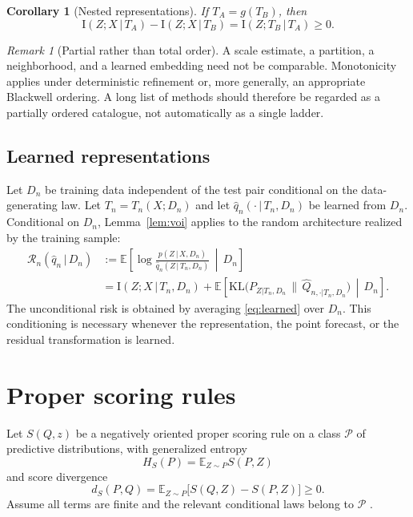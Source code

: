 \documentclass[11pt]{article}
\newtheorem{corollary}[theorem]{Corollary}
\theoremstyle{remark}
\newtheorem{remark}[theorem]{Remark}
\newcommand{\E}{\mathbb{E}}
\newcommand{\KL}{\mathrm{KL}}
\newcommand{\I}{\mathrm{I}}
\newcommand{\given}{\,|\,}
\newcommand{\Dn}{D_n}
\newcommand{\Reg}{\mathcal{R}}
\begin{document}
\begin{corollary}[Nested representations]\label{cor:nested}
If $T_A=g(T_B)$, then
\[
\I(Z;X\given T_A)-\I(Z;X\given T_B)=\I(Z;T_B\given T_A)\ge 0 .
\]
\end{corollary}

\begin{remark}[Partial rather than total order]
A scale estimate, a partition, a neighborhood, and a learned embedding need not be comparable.
Monotonicity applies under deterministic refinement or, more generally, an appropriate Blackwell
ordering. A long list of methods should therefore be regarded as a partially ordered catalogue,
not automatically as a single ladder.
\end{remark}

\subsection{Learned representations}\label{sec:learned}

Let $\Dn$ be training data independent of the test pair conditional on the data-generating law.
Let $T_n=T_n(X;\Dn)$ and let $\hat q_n(\cdot\given T_n,\Dn)$ be learned from $\Dn$. Conditional
on $\Dn$, Lemma~\ref{lem:voi} applies to the random architecture realized by the training
sample:
\begin{align}
\Reg_n(\hat q_n\given\Dn)&:=\E\!\left[\log\frac{p(Z\given X,\Dn)}{\hat q_n(Z\given
T_n,\Dn)}\,\middle|\,\Dn\right]\label{eq:learned}\\
&=\I(Z;X\given T_n,\Dn)
+\E\!\left[\KL\big(P_{Z|T_n,\Dn}\,\|\,\widehat Q_{n,\cdot|T_n,\Dn}\big)\,\middle|\,\Dn\right].
\nonumber
\end{align}
The unconditional risk is obtained by averaging \eqref{eq:learned} over $\Dn$. This conditioning
is necessary whenever the representation, the point forecast, or the residual transformation is
learned.

\section{Proper scoring rules}\label{sec:proper}

Let $S(Q,z)$ be a negatively oriented proper scoring rule on a class $\mathcal P$ of predictive
distributions, with generalized entropy
\[
H_S(P)=\E_{Z\sim P}S(P,Z)
\]
and score divergence
\[
d_S(P,Q)=\E_{Z\sim P}\big[S(Q,Z)-S(P,Z)\big]\ge 0 .
\]
Assume all terms are finite and the relevant conditional laws belong to $\mathcal P$
\citep{gneiting2007strictly,grunwald2004game}.
\end{document}

